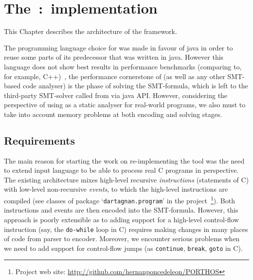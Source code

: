 \chapter{\nohyphens{The~\mousquetaires:~implementation}}
\label{ch:impl}



This Chapter describes the architecture of the \mousquetaires framework.

The programming language choice for \mousquetaires was made in favour of java in order to reuse some parts of its predecessor \Porthos that was written in java. However this language does not show best results in performance benchmarks (comparing to, for example, C++)~\cite{TODO}, the performance cornerstone of \mousquetaires (as well as any other SMT-based code analyser) is the phase of solving the SMT-formula, which is left to the third-party SMT-solver called from \mousquetaires via java API. However, considering the perspective of using \mousquetaires as a static analyser for real-world programs, we also must to take into account memory problems at both encoding and solving stages. 

\section{Requirements}
\label{ch:impl:requirements}

The main reason for starting the work on re-implementing the \Porthos tool was the need to extend input language to be able to process real C programs in perspective. The existing \Porthos architecture mixes high-level recursive \textit{instructions} (statements of C) with low-level non-recursive \textit{events}, to which the high-level instructions are compiled (see classes of package `\texttt{dartagnan.program}' in the \Porthos project~\footnote{Project web site: \url{http://github.com/hernanponcedeleon/PORTHOS}}). Both instructions and events are then encoded into the SMT-formula. However, this approach is poorly extensible as to adding support for a high-level control-flow instruction (say, the \texttt{do-while} loop in C) requires making changes in many places of code from parser to encoder. Moreover, we encounter serious problems when we need to add support for control-flow jumps (as \texttt{continue}, \texttt{break}, \texttt{goto} in C).

